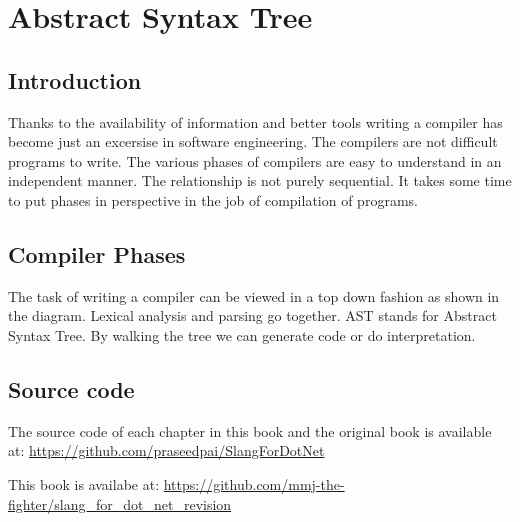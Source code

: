 \chapter{Abstract Syntax Tree}
\section{Introduction}
Thanks to the availability of information and better tools writing a compiler has become just an excersise in software engineering. The compilers are not difficult programs to write. The various phases of compilers are easy to understand in an independent manner. The relationship is not purely sequential. It takes some time to put phases in perspective in the job of compilation of programs. 
\section{Compiler Phases}
The task of writing a compiler can be viewed in a top down fashion as shown in the diagram. Lexical analysis and parsing go together. AST stands for Abstract Syntax Tree. By walking the tree we can generate code or do interpretation.\\
 \section{Source code}
 The source code of each chapter in this book and the original book is available at:
 \url{https://github.com/praseedpai/SlangForDotNet}
 
This book is availabe at: 
\url{https://github.com/mmj-the-fighter/slang_for_dot_net_revision}

\clearpage
